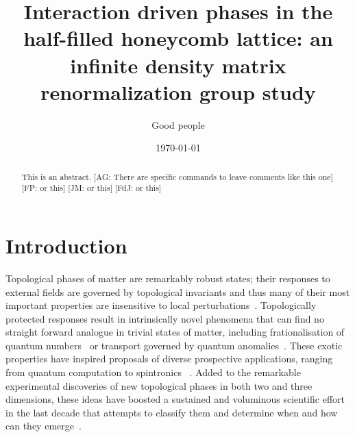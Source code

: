 \documentclass[aps,prx,10pt,twocolumn,floatfix,superscriptaddress,showpacs,numerical,footinbib]{revtex4-1}
\newcommand{\noteAG}[1]{{\color{blue} [AG: #1]}}
\newcommand{\noteFP}[1]{{\color{magenta} [FP: #1]}}
\newcommand{\noteJM}[1]{{\color{red} [JM: #1]}}
\newcommand{\noteFdJ}[1]{{\color{cyan} [FdJ: #1]}}
\begin{document}
%
\title{Interaction driven phases in the half-filled honeycomb lattice: an infinite density matrix renormalization group study}
%
\author{Good people}
%
\date{\today}
%
\begin{abstract}
%
This is an abstract.
%
\noteAG{There are specific commands to leave comments like this one}\noteFP{or this}\noteJM{or this}\noteFdJ{or this}
%
\end{abstract}
%
\maketitle
%

\section{Introduction}
%
Topological phases of matter are remarkably robust states; their responses to external fields are
governed by topological invariants and thus many of their most important properties are insensitive to local perturbations~\cite{HK10,QZ11}.
%
Topologically protected responses result in intrinsically novel phenomena that can find no straight forward analogue in trivial states
of matter, including frationalisation of quantum numbers~\cite{Nayak2008} or transport governed by quantum anomalies~\cite{V03}.
%
These exotic properties have inspired proposals of diverse prospective applications, ranging from quantum computation to spintronics~\cite{HK10,QZ11,Nayak2008} .
%
Added to the remarkable experimental discoveries of new topological phases in both two and three dimensions,
these ideas have boosted a sustained and voluminous scientific effort in the last decade that attempts to classify them 
and determine when and how can they emerge~\cite{HK10,QZ11}.\\
%
\end{document}

